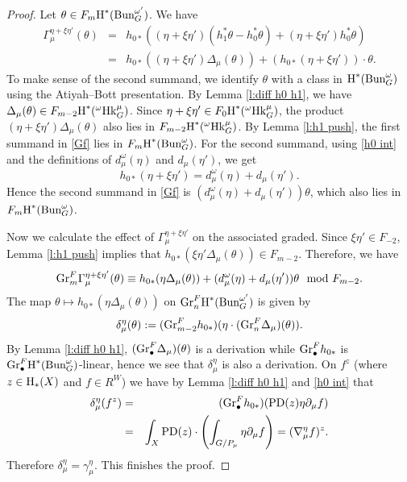 \documentclass[reqno]{amsart}
\numberwithin{equation}{subsection}
\theoremstyle{definition}
\newcommand{\Bun}{\textup{Bun}}
\newcommand{\Gr}{\textup{Gr}}
\newcommand\Hk{\mathrm{Hk}}
\newcommand{\bu}{\bullet}
\newcommand{\homog}[2]{\textup{H}_{#1}({#2})}  %
\newcommand{\cohog}[2]{\textup{H}^{#1}({#2})}     %
\newcommand\mt{\mapsto}
\newcommand\g\gamma
\newcommand\G\Gamma
\renewcommand\d\delta
\newcommand\D\Delta
\renewcommand{\th}{\theta}
\newcommand{\y}{\eta}
\newcommand{\om}{\omega}
\newcommand\PD{\textup{PD}}
\newcommand\nb{\nabla}
\newcommand\pl{\partial}
\begin{document}
\begin{proof}
Let $\th\in F_{m}\cohog{*}{\Bun^{\om'}_{G}}$. We have
\begin{eqnarray}\label{Gf}
\G_{\mu}^{\y + \xi \y'}(\th)&=&h_{0*}((\y+\xi\y')(h_{1}^{*}\th-h_{0}^{*}\th)+(\y+\xi\y') h_{0}^{*}\th) \nonumber \\ 
&=&h_{0*}((\y+\xi\y')\D_{\mu}(\th))+(h_{0*}(\y+\xi\y')) \cdot \th.
\end{eqnarray}
To make sense of the second summand, we identify $\th$ with a class in $\cohog{*}{\Bun^\om_G}$ using the Atiyah--Bott presentation. By Lemma \ref{l:diff h0 h1}, we have $\D_{\mu}(\th)\in F_{m-2}\cohog{*}{{}^{\om} \Hk^{\mu}_G}$. Since $\y+\xi \y'\in F_{0}\cohog{*}{{}^{\om} \Hk^{\mu}_G}$, the product $(\y+\xi\y')\D_{\mu}(\th)$ also lies in $F_{m-2}\cohog{*}{{}^{\om} \Hk^{\mu}_G}$. By Lemma \ref{l:h1 push}, the first summand in \eqref{Gf} lies in $F_{m}\cohog{*}{\Bun^{\om}_{G}}$. For the second summand, using \eqref{h0 int} and the definitions of $d^{\om}_{\mu}(\y)$ and $d_{\mu}(\y')$, we get
\begin{equation*}
h_{0*}(\y+\xi\y')=d^{\om}_{\mu}(\y)+d_{\mu}(\y').
\end{equation*}
Hence the second summand in \eqref{Gf} is $(d^{\om}_{\mu}(\y)+d_{\mu}(\y'))\th$, which also lies in $F_{m}\cohog{*}{\Bun^{\om}_{G}}$.

Now we calculate the effect of $\G_{\mu}^{\y + \xi \y'}$ on the associated graded. Since $\xi\y'\in F_{-2}$, Lemma \ref{l:h1 push} implies that $h_{0*} (\xi \eta'\Delta_\mu(\theta)) \in F_{m-2}$. Therefore, we have 
\begin{equation*}
\Gr^F_{m}\G_{\mu}^{\y + \xi \y'}(\th)\equiv h_{0*}(\y\D_{\mu}(\th))+(d^{\om}_{\mu}(\y)+d_{\mu}(\y'))\th\mod F_{m-2}.
\end{equation*}
The map $\th\mt h_{0*}(\y\D_{\mu}(\th))$ on $\Gr^F_n\cohog{*}{\Bun_G^{\om'}}$ is given by 
\begin{equation*}
    \d^\y_\mu(\th):= (\Gr^F_{m-2}h_{0*})(\y\cdot (\Gr^F_n\D_\mu)(\th)).
\end{equation*}
By Lemma \ref{l:diff h0 h1}, $(\Gr^F_\bu\D_\mu)(\th)$ is a derivation while $\Gr^F_{\bu}h_{0*}$ is $\Gr^F_{\bu}\cohog{*}{\Bun^{\om}_{G}}$-linear, hence we see that $\d^{\y}_{\mu}$ is also a derivation. On $f^{z}$ (where $z\in \homog{*}{X}$ and $f\in R^{W}$) we have by Lemma \ref{l:diff h0 h1} and \eqref{h0 int} that 
\begin{eqnarray*}
    \d^{\y}_{\mu}(f^{z}) & = & (\Gr^F_{\bu}h_{0*})(\PD(z)\y\pl_{\mu}f) \\
    &  = & \int_{X}\PD(z)\cdot \left(\int_{G/P_{\mu}}\y\pl_{\mu}f\right)=(\nb_{\mu}^{\y}f)^{z}.
\end{eqnarray*}
Therefore $\d^\y_\mu=\g^\y_\mu$. This finishes the proof.
\end{proof}
\end{document}
